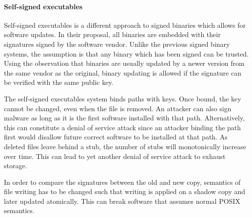 \paragraph{Self-signed executables}

Self-signed executables \cite{selfsign} is a different approach
to signed binaries which allows for software updates.
In their proposal, all binaries are embedded with their signatures signed
by the software vendor.
Unlike the previous signed binary systems, the assumption is that any
binary which has been signed can be trusted.
Using the observation that binaries are usually updated by a newer
version from the same vendor as the original,
binary updating is allowed if the signature can be verified
with the same public key.

The self-signed executables system binds paths with keys.
Once bound, the key cannot be changed, even when the file is removed.
An attacker can also sign malware as long as it is the first
software installed with that path.
Alternatively, this can constitute a denial of service attack since
an attacker binding the path first would disallow future correct
software to be installed at that path.
As deleted files leave behind a stub, the number of stubs will
monotonically increase over time. This can lead to yet another
denial of service attack to exhaust storage.

In order to compare the signatures between the old and new copy,
semantics of file writing has to be changed such that
writing is applied on a shadow copy and later updated atomically.
This can break software that assumes normal POSIX semantics.
